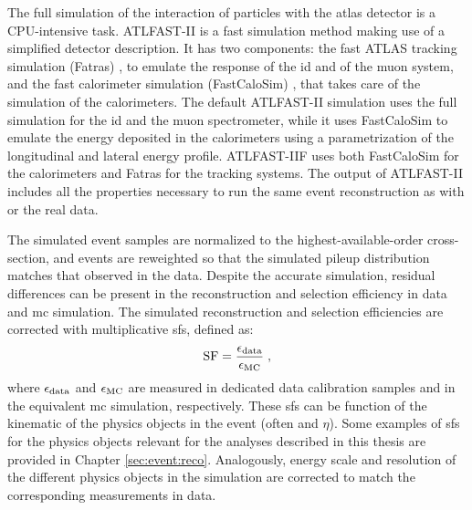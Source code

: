 The full simulation of the interaction of particles with the \gls{atlas} detector is a CPU-intensive task. 
ATLFAST-II \cite{Aad:2010ah} is a fast simulation method 
making use of a simplified detector description. 
It has two components: the fast ATLAS tracking simulation (Fatras) \cite{Edmonds:2008zz}, to emulate the response of the \gls{id} and of the muon system, 
and the fast calorimeter simulation (FastCaloSim) \cite{ATL-PHYS-PUB-2010-013}, that takes care of the simulation of the calorimeters. The default ATLFAST-II simulation uses the full \geant simulation for the \gls{id} and the muon spectrometer, 
while it uses FastCaloSim to emulate the energy deposited in the calorimeters using a parametrization of the longitudinal and lateral energy profile. 
ATLFAST-IIF uses both FastCaloSim for the calorimeters and Fatras for the tracking systems. 
The output of ATLFAST-II includes all the properties necessary to run the same event reconstruction as with \geant or the real data.


The simulated event samples are normalized to the highest-available-order cross-section, 
and events are reweighted so that the simulated pileup distribution matches that observed in the data.
Despite the accurate simulation, residual differences can be present in the reconstruction and selection efficiency in data and \gls{mc} simulation. 
The simulated reconstruction and selection efficiencies are corrected with multiplicative \glspl{sf}, defined as:
\begin{equation}
{\rm SF} = \frac{\epsilon_{\rm data}}{\epsilon_{\rm MC}} \; , \nonumber
\end{equation}
\noindent where $\epsilon_{\rm data}$ and $\epsilon_{\rm MC}$ are measured in dedicated data calibration samples 
and in the equivalent \gls{mc} simulation, respectively.
These \glspl{sf} can be function of the kinematic of the physics objects in the event (often \pt and $\eta$). 
Some examples of \glspl{sf} for the physics objects relevant for the analyses described in this thesis are provided in Chapter \ref{sec:event:reco}.
Analogously, energy scale and resolution of the different physics objects in the simulation are corrected 
to match the corresponding measurements in data.


\clearpage 



